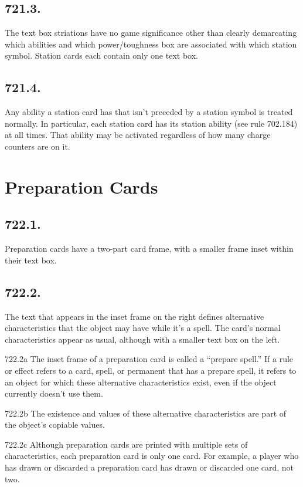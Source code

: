 \subsection*{721.3.}
The text box striations have no game significance other than clearly demarcating which abilities and which power/toughness box are associated with which station symbol. Station cards each contain only one text box.

\subsection*{721.4.}
Any ability a station card has that isn’t preceded by a station symbol is treated normally. In particular, each station card has its station ability (see rule 702.184) at all times. That ability may be activated regardless of how many charge counters are on it.

\section{Preparation Cards}
\subsection*{722.1.}
Preparation cards have a two-part card frame, with a smaller frame inset within their text box.

\subsection*{722.2.}
The text that appears in the inset frame on the right defines alternative characteristics that the object may have while it’s a spell. The card’s normal characteristics appear as usual, although with a smaller text box on the left.

722.2a The inset frame of a preparation card is called a “prepare spell.” If a rule or effect refers to a card, spell, or permanent that has a prepare spell, it refers to an object for which these alternative characteristics exist, even if the object currently doesn’t use them.

722.2b The existence and values of these alternative characteristics are part of the object’s copiable values.

722.2c Although preparation cards are printed with multiple sets of characteristics, each preparation card is only one card. For example, a player who has drawn or discarded a preparation card has drawn or discarded one card, not two.

